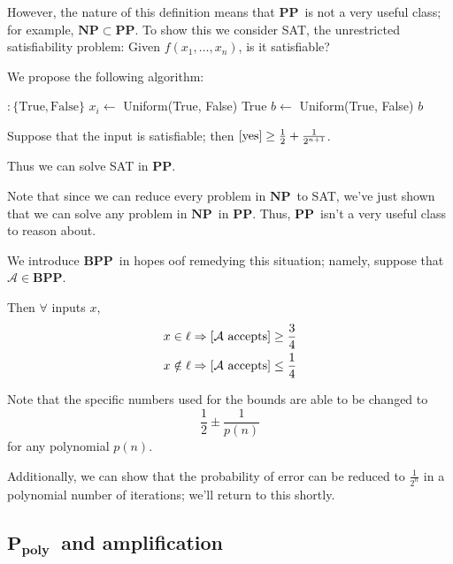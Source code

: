 \documentclass[11pt]{article}
\let\Pr\relax
\DeclareMathOperator*{\Pr}{\mathbb{P}}
\newcommand{\NP}{\ensuremath{\mathbf{NP}}}
\newcommand{\PP}{\ensuremath{\mathbf{PP}}}
\newcommand{\BPP}{\ensuremath{\mathbf{BPP}}}
\newcommand{\Ppoly}{\ensuremath{\mathbf{P_{poly}}}}
\newcommand{\Alg}{\ensuremath{\mathcal{A}}}
\begin{document}
However, the nature of this definition means that \PP\ is not a very useful class; for example, $\NP\subset\PP$. To show this we consider SAT, the unrestricted satisfiability problem: Given $f(x_1, \dots, x_n)$, is it satisfiable?

We propose the following algorithm:

\begin{algorithm}[H]
\begin{algorithmic}
$: \{\mathrm{True},\mathrm{False}\}$
    \State $x_i \gets $ Uniform(True, False)
  \EndFor
    \State \Return True
  \Else
    \State $b \gets $ Uniform(True, False)
    \State \Return $b$
  \EndIf
\EndFunction
\end{algorithmic}
\end{algorithm}

Suppose that the input is satisfiable; then $\Pr[\text{yes}] \geq \frac{1}{2} + \frac{1}{2^{n+1}}$.

Thus we can solve SAT in \PP.

Note that since we can reduce every problem in \NP\ to SAT, we've just shown that we can solve any problem in \NP\ in \PP. Thus, \PP\ isn't a very useful class to reason about.

We introduce \BPP\ in hopes oof remedying this situation; namely, suppose that $\Alg\in\BPP$.

Then $\forall$ inputs $x$,
\begin{align*}
  x \in \ell &\Rightarrow \Pr[\Alg \text{ accepts}] \geq \frac{3}{4} \\
  x \notin \ell &\Rightarrow \Pr[\Alg \text{ accepts}] \leq \frac{1}{4}
\end{align*}

Note that the specific numbers used for the bounds are able to be changed to
$$\frac{1}{2} \pm \frac{1}{p(n)}$$
for any polynomial $p(n)$.

Additionally, we can show that the probability of error can be reduced to $\frac{1}{2^n}$ in a polynomial number of iterations; we'll return to this shortly.

\subsection{\Ppoly\ and amplification}
\end{document}

